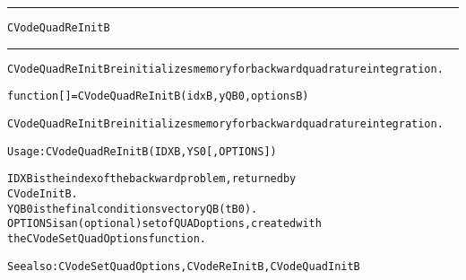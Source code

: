 \begin{samepage}
\hrule
\begin{center}
{\large \verb!CVodeQuadReInitB!}
\label{p:CVodeQuadReInitB}
\end{center}
\hrule\vspace{0.1in}



\begin{alltt}
CVodeQuadReInitB reinitializes memory for backward quadrature integration.
\end{alltt}

\end{samepage}



\begin{samepage}


\begin{alltt}
function [] = CVodeQuadReInitB(idxB, yQB0, optionsB) 
\end{alltt}

\end{samepage}



\begin{alltt}
CVodeQuadReInitB reinitializes memory for backward quadrature integration.

   Usage: CVodeQuadReInitB ( IDXB, YS0 [, OPTIONS ] ) 

   IDXB     is the index of the backward problem, returned by
            CVodeInitB.
   YQB0     is the final conditions vector yQB(tB0).
   OPTIONS  is an (optional) set of QUAD options, created with
            the CVodeSetQuadOptions function. 

   See also: CVodeSetQuadOptions, CVodeReInitB, CVodeQuadInitB
\end{alltt}






\vspace{0.1in}